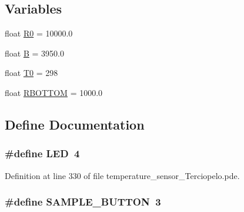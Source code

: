 \subsection*{Variables}
\begin{CompactItemize}
\item 
float \hyperlink{applet_2temperature__sensor___terciopelo_8pde_735577560ca40e5b6008a98829068904}{R0} = 10000.0
\item 
float \hyperlink{applet_2temperature__sensor___terciopelo_8pde_8188fea1f6709096fe21a3ee084d00d0}{B} = 3950.0
\item 
float \hyperlink{applet_2temperature__sensor___terciopelo_8pde_4211ba1269f650e21964d32238a460b2}{T0} = 298
\item 
float \hyperlink{applet_2temperature__sensor___terciopelo_8pde_d17df5990b551ac9e97a3d60f65833ff}{RBOTTOM} = 1000.0
\end{CompactItemize}


\subsection{Define Documentation}
\hypertarget{applet_2temperature__sensor___terciopelo_8pde_eb7a7ba1ab7e0406f1b5ab36d579f585}{
\subsubsection[{LED}]{\setlength{\rightskip}{0pt plus 5cm}\#define LED~4}}
\label{applet_2temperature__sensor___terciopelo_8pde_eb7a7ba1ab7e0406f1b5ab36d579f585}




Definition at line 330 of file temperature\_\-sensor\_\-Terciopelo.pde.\hypertarget{applet_2temperature__sensor___terciopelo_8pde_b2de299215608c2a35f0feb86adc2f6f}{
\subsubsection[{SAMPLE\_\-BUTTON}]{\setlength{\rightskip}{0pt plus 5cm}\#define SAMPLE\_\-BUTTON~3}}
\label{applet_2temperature__sensor___terciopelo_8pde_b2de299215608c2a35f0feb86adc2f6f}




